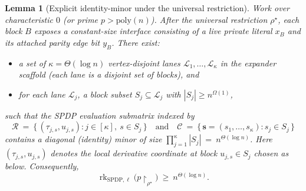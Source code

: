 \documentclass[12pt]{article}
\newtheorem{lemma}[theorem]{Lemma}
\theoremstyle{definition}
\theoremstyle{definition}
\theoremstyle{remark}
\theoremstyle{remark}
\begin{document}
\begin{lemma}[Explicit identity-minor under the universal restriction]\label{lem:explicit-id-minor}
Work over characteristic $0$ (or prime $p>\mathrm{poly}(n)$).
After the universal restriction $\rho^\star$, each block $B$ exposes a constant-size
interface consisting of a live private literal $x_B$ and its attached parity edge bit $y_B$.
There exist:
\begin{itemize}
\item a set of $\kappa=\Theta(\log n)$ vertex-disjoint \emph{lanes} $\mathcal{L}_1,\dots,\mathcal{L}_\kappa$ in the expander scaffold (each lane is a disjoint set of blocks), and
\item for each lane $\mathcal{L}_j$, a block subset $S_j\subseteq \mathcal{L}_j$ with $|S_j| \ge n^{\Omega(1)}$,
\end{itemize}
such that the SPDP evaluation submatrix indexed by
\[
\mathcal{R}\ =\ \big\{\,(\tau_{j,s},u_{j,s}) : j\in[\kappa],\ s\in S_j\,\big\}
\quad\text{and}\quad
\mathcal{C}\ =\ \big\{\,\mathbf{s}=(s_1,\dots,s_\kappa): s_j\in S_j\,\big\}
\]
contains a diagonal (identity) minor of size $\prod_{j=1}^\kappa |S_j|\ =\ n^{\Theta(\log n)}$.
Here $(\tau_{j,s},u_{j,s})$ denotes the local derivative coordinate at block $u_{j,s}\in S_j$
chosen as below. Consequently,
\[
\operatorname{rk}_{\mathrm{SPDP},\ell}\big(p\!\upharpoonright_{\rho^\star}\big)\ \ge\ n^{\Theta(\log n)}.
\]
\end{lemma}
\end{document}
